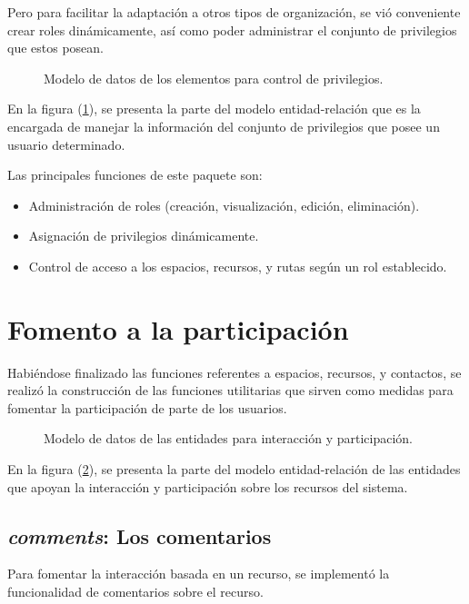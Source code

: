 Pero para facilitar la adaptación a otros tipos de organización, se vió
conveniente crear roles dinámicamente, así como poder administrar el conjunto
de privilegios que estos posean.

\begin{figure}
\centering

\caption{Modelo de datos de los elementos para control de privilegios.}
\label{modelo6}
\end{figure}

En la figura (\ref{modelo6}), se presenta la parte del modelo entidad-relación
que es la encargada de manejar la información del conjunto de privilegios que
posee un usuario determinado.

Las principales funciones de este paquete son:

\begin{itemize}
\item Administración de roles (creación, visualización, edición, eliminación).
\item Asignación de privilegios dinámicamente.
\item Control de acceso a los espacios, recursos, y rutas según un rol
establecido.
\end{itemize}

\section{Fomento a la participación}
Habiéndose finalizado las funciones referentes a espacios, recursos, y
contactos, se realizó la construcción de las funciones utilitarias que sirven
como medidas para fomentar la participación de parte de los usuarios.

\begin{figure}
\centering

\caption{Modelo de datos de las entidades para interacción y participación.}
\label{modelo7}
\end{figure}

En la figura (\ref{modelo7}), se presenta la parte del modelo entidad-relación
de las entidades que apoyan la interacción y participación sobre los recursos
del sistema.

\subsection{\emph{comments}: Los comentarios}
Para fomentar la interacción basada en un recurso, se implementó la
funcionalidad de comentarios sobre el recurso.


